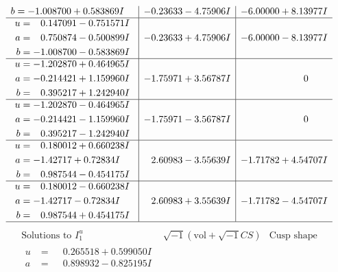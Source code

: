 \documentclass[1p]{elsarticle_modified}
\theoremstyle{definition}
\newcommand{\I}{\sqrt{-1}}
\begin{document}
$$\begin{array}{c|c|c}
\begin{aligned}
b &= -1.008700 + 0.583869 I\end{aligned}
 & -0.23633 - 4.75906 I & -6.00000 + 8.13977 I \\ \hline\begin{aligned}
u &= \phantom{-}0.147091 - 0.751571 I \\
a &= \phantom{-}0.750874 - 0.500899 I \\
b &= -1.008700 - 0.583869 I\end{aligned}
 & -0.23633 + 4.75906 I & -6.00000 - 8.13977 I \\ \hline\begin{aligned}
u &= -1.202870 + 0.464965 I \\
a &= -0.214421 + 1.159960 I \\
b &= \phantom{-}0.395217 + 1.242940 I\end{aligned}
 & -1.75971 + 3.56787 I & \phantom{-0.000000 } 0 \\ \hline\begin{aligned}
u &= -1.202870 - 0.464965 I \\
a &= -0.214421 - 1.159960 I \\
b &= \phantom{-}0.395217 - 1.242940 I\end{aligned}
 & -1.75971 - 3.56787 I & \phantom{-0.000000 } 0 \\ \hline\begin{aligned}
u &= \phantom{-}0.180012 + 0.660238 I \\
a &= -1.42717 + 0.72834 I \\
b &= \phantom{-}0.987544 - 0.454175 I\end{aligned}
 & \phantom{-}2.60983 - 3.55639 I & -1.71782 + 4.54707 I \\ \hline\begin{aligned}
u &= \phantom{-}0.180012 - 0.660238 I \\
a &= -1.42717 - 0.72834 I \\
b &= \phantom{-}0.987544 + 0.454175 I\end{aligned}
 & \phantom{-}2.60983 + 3.55639 I & -1.71782 - 4.54707 I\\
 \hline 
 \end{array}$$\newpage$$\begin{array}{c|c|c}  
\text{Solutions to }I^u_{1}& \I (\text{vol} + \sqrt{-1}CS) & \text{Cusp shape}\\
 \hline 
\begin{aligned}
u &= \phantom{-}0.265518 + 0.599050 I \\
a &= \phantom{-}0.898932 - 0.825195 I \\

\end{aligned}
\end{array}$$
\end{document}
